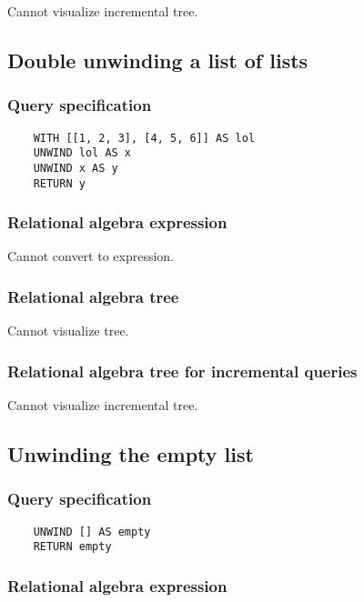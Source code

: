 	Cannot visualize incremental tree.
	\subsection{Double unwinding a list of lists}

	\subsubsection*{Query specification}

	\begin{lstlisting}
	WITH [[1, 2, 3], [4, 5, 6]] AS lol
	UNWIND lol AS x
	UNWIND x AS y
	RETURN y
	\end{lstlisting}


	\subsubsection*{Relational algebra expression}

	Cannot convert to expression.

	\subsubsection*{Relational algebra tree}

	Cannot visualize tree.

	\subsubsection*{Relational algebra tree for incremental queries}

	Cannot visualize incremental tree.
	\subsection{Unwinding the empty list}

	\subsubsection*{Query specification}

	\begin{lstlisting}
	UNWIND [] AS empty
	RETURN empty
	\end{lstlisting}


	\subsubsection*{Relational algebra expression}

